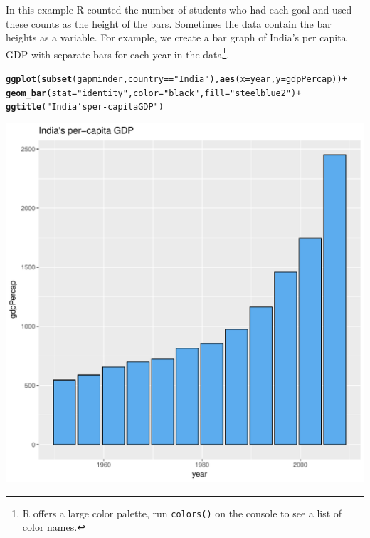 \documentclass[12pt,oneside]{book}\usepackage[]{graphicx}\usepackage[]{color}
\makeatletter
\def\maxwidth{ %
  \ifdim\Gin@nat@width>\linewidth
    \linewidth
  \else
    \Gin@nat@width
  \fi
}
\newcommand{\hlstr}[1]{\textcolor[rgb]{0.192,0.494,0.8}{#1}}%
\newcommand{\hlopt}[1]{\textcolor[rgb]{0,0,0}{#1}}%
\newcommand{\hlstd}[1]{\textcolor[rgb]{0.345,0.345,0.345}{#1}}%
\newcommand{\hlkwc}[1]{\textcolor[rgb]{0.333,0.667,0.333}{#1}}%
\newcommand{\hlkwd}[1]{\textcolor[rgb]{0.737,0.353,0.396}{\textbf{#1}}}%
\newenvironment{kframe}{%
 \def\at@end@of@kframe{}%
 \ifinner\ifhmode%
  \def\at@end@of@kframe{\end{minipage}}%
  \begin{minipage}{\columnwidth}%
 \fi\fi%
 \def\FrameCommand##1{\hskip\@totalleftmargin \hskip-\fboxsep
 \colorbox{shadecolor}{##1}\hskip-\fboxsep
     \hskip-\linewidth \hskip-\@totalleftmargin \hskip\columnwidth}%
 \MakeFramed {\advance\hsize-\width
   \@totalleftmargin\z@ \linewidth\hsize
   \@setminipage}}%
 {\par\unskip\endMakeFramed%
 \at@end@of@kframe}
\newenvironment{knitrout}{}{} %
\makeatother
\begin{document}
In this example R counted the number of students who had each goal and used these counts as the height of the bars. Sometimes the data contain the bar heights as a variable. For example, we create a bar graph of India's per capita GDP with separate bars for each year in the data\footnote{R offers a large color palette, run \texttt{colors()} on the console to see a list of color names.}. 

\begin{knitrout}
\color{fgcolor}\begin{kframe}
\begin{alltt}
\hlkwd{ggplot}\hlstd{(}\hlkwd{subset}\hlstd{(gapminder, country} \hlopt{==} \hlstr{"India"}\hlstd{),} \hlkwd{aes}\hlstd{(}\hlkwc{x} \hlstd{= year,} \hlkwc{y} \hlstd{= gdpPercap))} \hlopt{+}
    \hlkwd{geom_bar}\hlstd{(}\hlkwc{stat} \hlstd{=} \hlstr{"identity"}\hlstd{,} \hlkwc{color} \hlstd{=} \hlstr{"black"}\hlstd{,} \hlkwc{fill} \hlstd{=} \hlstr{"steelblue2"}\hlstd{)} \hlopt{+}
    \hlkwd{ggtitle}\hlstd{(}\hlstr{"India's per-capita GDP"}\hlstd{)}
\end{alltt}
\end{kframe}
\includegraphics[width=\maxwidth]{figure/unnamed-chunk-82-1} 

\end{knitrout}
\end{document}
